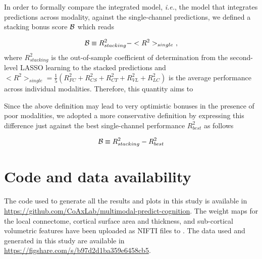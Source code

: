 \documentclass[10pt,letterpaper]{article}
\begin{document}
In order to formally compare the integrated model, {\it i.e.}, the model that integrates predictions across modality, against the single-channel predictions, we defined a stacking bonus score ${\cal B}$ which reads

\begin{equation}
{\cal B} \equiv R^2_{stacking} - <R^2>_{single} \ ,
\end{equation}
where $R^2_{stacking}$ is the out-of-sample coefficient of determination from the second-level LASSO learning to the stacked predictions and  $<R^2>_{single} = \frac{1}{5} \left( R^2_{FC} + R^2_{CS} + R^2_{CT} + R^2_{VL} + R^2_{LC}\right)$ is the average performance across individual modalities. Therefore, this quantity aims to 

Since the above definition may lead to very optimistic bonuses in the presence of poor modalities, we  adopted a more conservative definition by expressing this difference just against the best single-channel performance $R^2_{best}$ as follows

\begin{equation}
{\cal B} \equiv R^2_{stacking} - R^2_{best}
\end{equation}

\section*{Code and data availability}
The code used to generate all the results and plots in this study is available in \url{https://github.com/CoAxLab/multimodal-predict-cognition}. The  weight maps for the local connectome, cortical surface area and thickness, and sub-cortical volumetric features have been uploaded as NIFTI files to . The  data used and generated in this study are available in  \url{https://figshare.com/s/b97d2d1ba359e6458cb5}.
\end{document}
